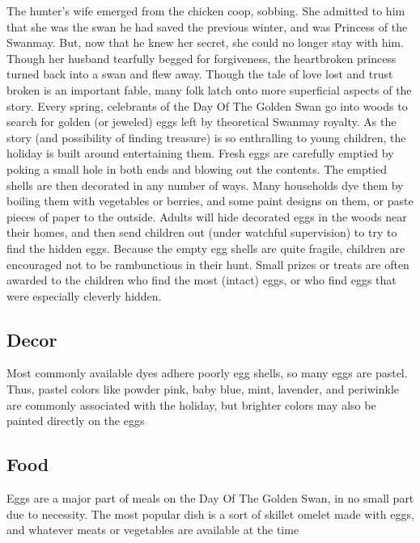 \documentclass[10pt,a4paper,twoside,bg=print,twocolumn,openany,nodeprecatedcode]{dndbook}
\begin{document}
The hunter's wife emerged from the chicken coop, sobbing. She admitted to him that she was the swan he had saved the previous winter, and was Princess of the Swanmay. But, now that he knew her secret, she could no longer stay with him. Though her husband tearfully begged for forgiveness, the heartbroken princess turned back into a swan and flew away. Though the tale of love lost and trust broken is an important fable, many folk latch onto more superficial aspects of the story. Every spring, celebrants of the Day Of The Golden Swan go into woods to search for golden (or jeweled) eggs left by theoretical Swanmay royalty. As the story (and possibility of finding treasure) is so enthralling to young children, the holiday is built around entertaining them. Fresh eggs are carefully emptied by poking a small hole in both ends and blowing out the contents. The emptied shells are then decorated in any number of ways. Many households dye them by boiling them with vegetables or berries, and some paint designs on them, or paste pieces of paper to the outside. Adults will hide decorated eggs in the woods near their homes, and then send children out (under watchful supervision) to try to find the hidden eggs. Because the empty egg shells are quite fragile, children are encouraged not to be rambunctious in their hunt. Small prizes or treats are often awarded to the children who find the most (intact) eggs, or who find eggs that were especially cleverly hidden.
\subsection{Decor}
Most commonly available dyes adhere poorly egg shells, so many eggs are pastel. Thus, pastel colors like powder pink, baby blue, mint, lavender, and periwinkle are commonly associated with the holiday, but brighter colors may also be painted directly on the eggs
\subsection{Food}
Eggs are a major part of meals on the Day Of The Golden Swan, in no small part due to necessity. The most popular dish is a sort of skillet omelet made with eggs, and whatever meats or vegetables are available at the time
\end{document}
